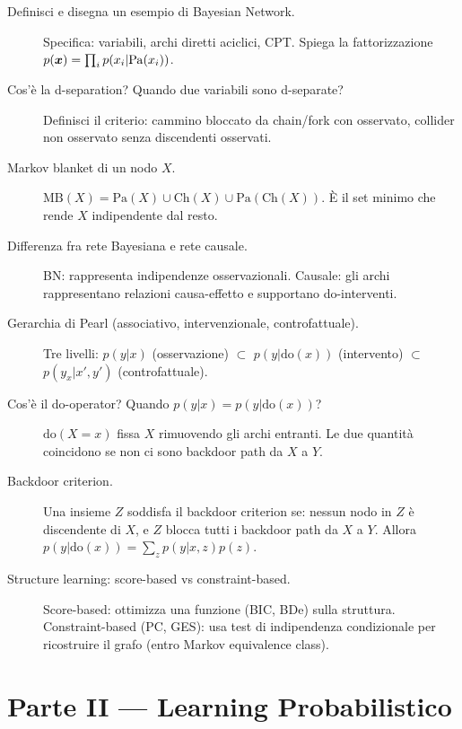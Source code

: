 \begin{description}
  \item[Definisci e disegna un esempio di Bayesian Network.] Specifica: variabili, archi diretti aciclici, CPT. Spiega la fattorizzazione $p(\bm{x}) = \prod_i p(x_i|\mathrm{Pa}(x_i))$.
  \item[Cos'è la d-separation? Quando due variabili sono d-separate?] Definisci il criterio: cammino bloccato da chain/fork con osservato, collider non osservato senza discendenti osservati.
  \item[Markov blanket di un nodo $X$.] $\mathrm{MB}(X) = \mathrm{Pa}(X) \cup \mathrm{Ch}(X) \cup \mathrm{Pa}(\mathrm{Ch}(X))$. È il set minimo che rende $X$ indipendente dal resto.
  \item[Differenza fra rete Bayesiana e rete causale.] BN: rappresenta indipendenze osservazionali. Causale: gli archi rappresentano relazioni causa-effetto e supportano do-interventi.
  \item[Gerarchia di Pearl (associativo, intervenzionale, controfattuale).] Tre livelli: $p(y|x)$ (osservazione) $\subset$ $p(y|\mathrm{do}(x))$ (intervento) $\subset$ $p(y_x|x',y')$ (controfattuale).
  \item[Cos'è il do-operator? Quando $p(y|x) = p(y|\mathrm{do}(x))$?] $\mathrm{do}(X=x)$ fissa $X$ rimuovendo gli archi entranti. Le due quantità coincidono se non ci sono backdoor path da $X$ a $Y$.
  \item[Backdoor criterion.] Una insieme $Z$ soddisfa il backdoor criterion se: nessun nodo in $Z$ è discendente di $X$, e $Z$ blocca tutti i backdoor path da $X$ a $Y$. Allora $p(y|\mathrm{do}(x)) = \sum_z p(y|x,z) p(z)$.
  \item[Structure learning: score-based vs constraint-based.] Score-based: ottimizza una funzione (BIC, BDe) sulla struttura. Constraint-based (PC, GES): usa test di indipendenza condizionale per ricostruire il grafo (entro Markov equivalence class).
\end{description}

\section{Parte II — Learning Probabilistico}


